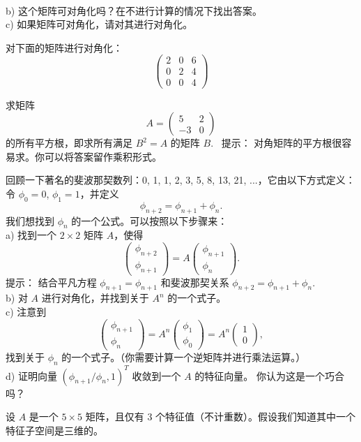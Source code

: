 \begin{problemset}
\\
b) 这个矩阵可对角化吗？在不进行计算的情况下找出答案。
\\
c) 如果矩阵可对角化，请对其进行对角化。
\item \label{ex:04-02-07} 对下面的矩阵进行对角化：$$\begin{pmatrix} 2 & 0 & 6 \\ 0 & 2 & 4 \\ 0 & 0 & 4 \end{pmatrix}$$
\item \label{ex:04-02-08} 求矩阵 $$A = \begin{pmatrix} 5 & 2 \\ -3 & 0 \end{pmatrix}$$
的所有平方根，即求所有满足 $B^2 = A$ 的矩阵 $B$.~
{\heiti 提示：} 对角矩阵的平方根很容易求。你可以将答案留作乘积形式。
\item \label{ex:04-02-09} 回顾一下著名的斐波那契数列：0, 1, 1, 2, 3, 5, 8, 13, 21, ...，它由以下方式定义：令 $\phi_0 = 0$, $\phi_1 = 1$，并定义 $$\phi_{n+2} = \phi_{n+1} + \phi_n.$$
我们想找到 $\phi_n$ 的一个公式。可以按照以下步骤来：
\\
a) 找到一个 $2 \times 2$ 矩阵 $A$，使得 $$\begin{pmatrix} \phi_{n+2} \\ \phi_{n+1} \end{pmatrix} = A \begin{pmatrix} \phi_{n+1} \\ \phi_n \end{pmatrix}.$$
{\heiti 提示：} 结合平凡方程 $\phi_{n+1} = \phi_{n+1}$ 和斐波那契关系 $\phi_{n+2} = \phi_{n+1} + \phi_n$.~
\\
b) 对 $A$ 进行对角化，并找到关于 $A^n$ 的一个式子。
\\
c) 注意到 $$\begin{pmatrix} \phi_{n+1} \\ \phi_n \end{pmatrix} = A^n \begin{pmatrix} \phi_1 \\ \phi_0 \end{pmatrix} = A^n \begin{pmatrix} 1 \\ 0 \end{pmatrix},$$
找到关于 $\phi_n$ 的一个式子。（你需要计算一个逆矩阵并进行乘法运算。）
\\
d) 证明向量 $(\phi_{n+1}/\phi_n, 1)^T$ 收敛到一个 $A$ 的特征向量。
\quad 你认为这是一个巧合吗？
\item \label{ex:04-02-10} 设 $A$ 是一个 $5 \times 5$ 矩阵，且仅有 3 个特征值（不计重数）。假设我们知道其中一个特征子空间是三维的。

\end{problemset}
